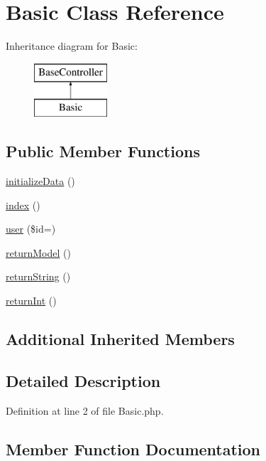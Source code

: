 \hypertarget{class_basic}{}\section{Basic Class Reference}
\label{class_basic}
Inheritance diagram for Basic\+:\begin{figure}[H]
\begin{center}
\leavevmode
\includegraphics[height=2.000000cm]{class_basic}
\end{center}
\end{figure}
\subsection*{Public Member Functions}
\begin{DoxyCompactItemize}
\item 
\hyperlink{class_basic_a8e1839f9e7441ef2a15a3f5ca8fa6f8e}{initialize\+Data} ()
\item 
\hyperlink{class_basic_a149eb92716c1084a935e04a8d95f7347}{index} ()
\item 
\hyperlink{class_basic_a6603546e99f9519b86989be128736ad6}{user} (\$id=\textquotesingle{}\textquotesingle{})
\item 
\hyperlink{class_basic_a7cb6a02987f0faaef2ee4aff9198907e}{return\+Model} ()
\item 
\hyperlink{class_basic_a5bb666dcea19a9561c2047cfa25936bd}{return\+String} ()
\item 
\hyperlink{class_basic_a8d2918087022004ef5ad62d8f76a73d7}{return\+Int} ()
\end{DoxyCompactItemize}
\subsection*{Additional Inherited Members}


\subsection{Detailed Description}


Definition at line 2 of file Basic.\+php.



\subsection{Member Function Documentation}
\hypertarget{class_basic_a149eb92716c1084a935e04a8d95f7347}{}\label{class_basic_a149eb92716c1084a935e04a8d95f7347} 
